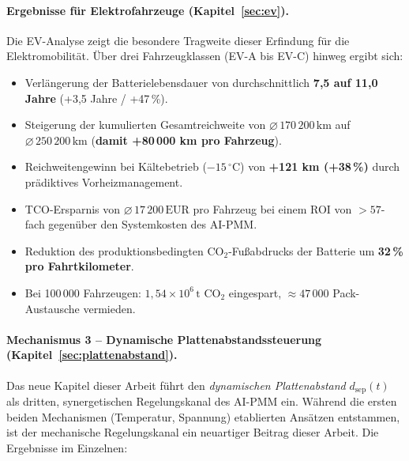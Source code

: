 ﻿\documentclass[12pt,a4paper]{article}
\begin{document}
	\paragraph{Ergebnisse für Elektrofahrzeuge (Kapitel~\ref{sec:ev}).}
	Die EV-Analyse zeigt die besondere Tragweite dieser Erfindung für die
	Elektromobilität. Über drei Fahrzeugklassen (EV-A bis EV-C) hinweg ergibt sich:
	
	\begin{itemize}[leftmargin=*]
		\item Verlängerung der Batterielebensdauer von durchschnittlich
		\textbf{7{,}5 auf 11{,}0 Jahre} (+3{,}5 Jahre / +47\,\%).
		\item Steigerung der kumulierten Gesamtreichweite von
		$\varnothing\,170\,200\,\mathrm{km}$ auf $\varnothing\,250\,200\,\mathrm{km}$
		(\textbf{damit +80\,000 km pro Fahrzeug}).
		\item Reichweitengewinn bei Kältebetrieb ($-15\,^\circ\mathrm{C}$) von
		\textbf{+121 km (+38\,\%)} durch prädiktives Vorheizmanagement.
		\item TCO-Ersparnis von $\varnothing\,17\,200\,\text{EUR}$ pro Fahrzeug
		bei einem ROI von $> 57$-fach gegenüber den Systemkosten des AI-PMM.
		\item Reduktion des produktionsbedingten CO$_2$-Fußabdrucks der Batterie
		um \textbf{32\,\% pro Fahrtkilometer}.
		\item Bei 100\,000 Fahrzeugen: $1{,}54 \times 10^6\,\mathrm{t}$ CO$_2$
		eingespart, $\approx 47\,000$ Pack-Austausche vermieden.
	\end{itemize}
	
	\paragraph{Mechanismus 3 -- Dynamische Plattenabstandssteuerung
		(Kapitel~\ref{sec:plattenabstand}).}
	Das neue Kapitel dieser Arbeit führt den \textit{dynamischen Plattenabstand}
	$d_\mathrm{sep}(t)$ als dritten, synergetischen Regelungskanal des AI-PMM ein.
	Während die ersten beiden Mechanismen (Temperatur, Spannung) etablierten
	Ansätzen entstammen, ist der mechanische Regelungskanal ein neuartiger Beitrag
	dieser Arbeit. Die Ergebnisse im Einzelnen:
	
\end{document}
